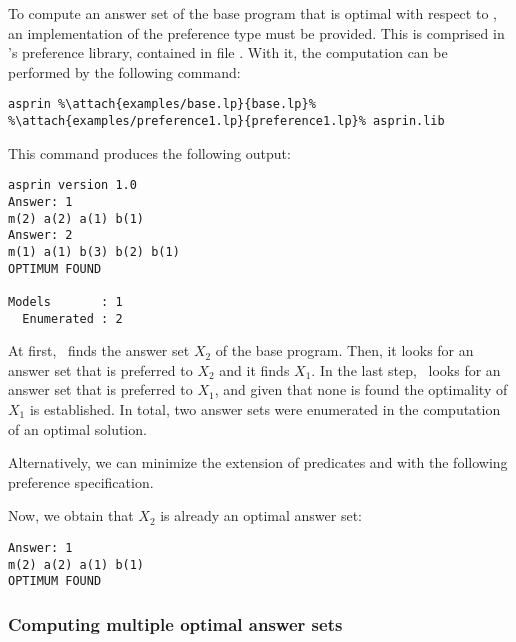 \begin{example}
To compute an answer set of the base program that is optimal with respect to , 
an implementation of the preference type  must be provided.
This is comprised in \asprin's preference library,
contained in file .
With it, the computation can be performed by the following command:
%
%
\begin{lstlisting}[numbers=none,escapechar=\%]
asprin %\attach{examples/base.lp}{base.lp}% %\attach{examples/preference1.lp}{preference1.lp}% asprin.lib
\end{lstlisting}
%
This command produces the following output:
%
\begin{lstlisting}[numbers=none]
asprin version 1.0
Answer: 1
m(2) a(2) a(1) b(1)
Answer: 2
m(1) a(1) b(3) b(2) b(1)
OPTIMUM FOUND

Models       : 1
  Enumerated : 2

\end{lstlisting}
%
At first, \asprin\ finds the answer set $X_2$ of the base program. 
Then, it looks for an answer set that is preferred to $X_2$ and it finds $X_1$. 
In the last step, \asprin\ looks for an answer set that is preferred to $X_1$,  
and given that none is found the optimality of $X_1$ is established. 
In total, two answer sets were enumerated in the computation of an optimal solution.

Alternatively,
we can minimize the extension of predicates  and  with the following preference specification.
%

%
Now, we obtain that $X_2$ is already an optimal answer set: 
\begin{lstlisting}[numbers=none]
Answer: 1
m(2) a(2) a(1) b(1)
OPTIMUM FOUND
\end{lstlisting}
\end{example}

\subsubsection{Computing multiple optimal answer sets}

